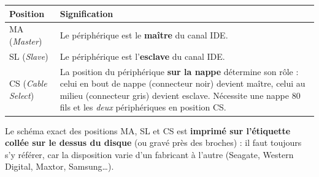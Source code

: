 \documentclass[11pt]{article}
\begin{document}
\begin{center}
\begin{tabularx}{\linewidth}{|l|X|}
\hline
\rowcolor{popblueL} \textbf{Position} & \textbf{Signification} \\
\hline
MA (\emph{Master}) & Le périphérique est le \textbf{maître} du canal IDE. \\
\hline
SL (\emph{Slave}) & Le périphérique est l'\textbf{esclave} du canal IDE. \\
\hline
CS (\emph{Cable Select}) & La position du périphérique \textbf{sur la nappe} détermine son rôle : celui en bout de nappe (connecteur noir) devient maître, celui au milieu (connecteur gris) devient esclave. Nécessite une nappe 80 fils et les \emph{deux} périphériques en position CS. \\
\hline
\end{tabularx}
\end{center}

Le schéma exact des positions MA, SL et CS est \textbf{imprimé sur l'étiquette collée sur le dessus du disque} (ou gravé près des broches) : il faut toujours s'y référer, car la disposition varie d'un fabricant à l'autre (Seagate, Western Digital, Maxtor, Samsung\ldots).
\end{document}
